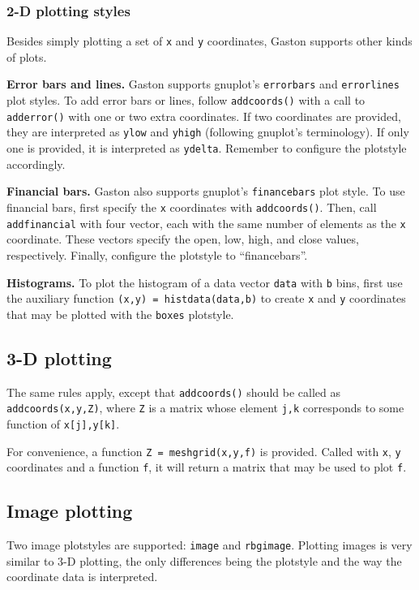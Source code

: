 \documentclass[11pt]{article}
\newcommand{\cmd}[1]{\texttt{#1}}
\begin{document}
\subsubsection{2-D plotting styles}

Besides simply plotting a set of \cmd{x} and \cmd{y} coordinates, Gaston
supports other kinds of plots.

\textbf{Error bars and lines.} Gaston supports gnuplot's \cmd{errorbars} and
\cmd{errorlines} plot styles. To add error bars or lines, follow
\cmd{addcoords()} with a call to \cmd{adderror()} with one or two extra
coordinates. If two coordinates are provided, they are interpreted as \cmd{ylow}
and \cmd{yhigh} (following gnuplot's terminology). If only one is provided, it
is interpreted as \cmd{ydelta}. Remember to configure the plotstyle
accordingly.

\textbf{Financial bars.} Gaston also supports gnuplot's \cmd{financebars}
plot style. To use financial bars, first specify the \cmd{x} coordinates with
\cmd{addcoords()}. Then, call \cmd{addfinancial} with four vector, each with
the same number of elements as the \cmd{x} coordinate. These vectors specify
the open, low, high, and close values, respectively. Finally, configure the
plotstyle to ``financebars''.

\textbf{Histograms.} To plot the histogram of a data vector \cmd{data} with
\cmd{b} bins, first use the auxiliary function \cmd{(x,y) = histdata(data,b)}
to create \cmd{x} and \cmd{y} coordinates that may be plotted with the
\cmd{boxes} plotstyle.

\subsection{3-D plotting}

The same rules apply, except that \cmd{addcoords()} should be called as
\cmd{addcoords(x,y,Z)}, where \cmd{Z} is a matrix whose element \cmd{j,k}
corresponds to some function of \cmd{x[j],y[k]}.

For convenience, a function \cmd{Z = meshgrid(x,y,f)} is provided. Called with
\cmd{x}, \cmd{y} coordinates and a function \cmd{f}, it will return a matrix
that may be used to plot \cmd{f}.

\subsection{Image plotting}

Two image plotstyles are supported: \cmd{image} and \cmd{rbgimage}. Plotting
images is very similar to 3-D plotting, the only differences being the
plotstyle and the way the coordinate data is interpreted.
\end{document}
